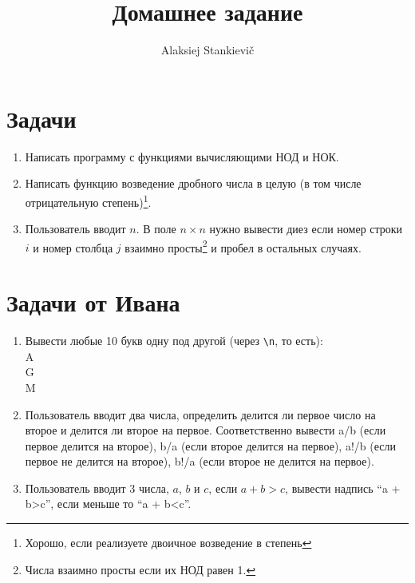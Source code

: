 \documentclass[12pt]{article}
\author{Alaksiej Stankievič}
\title{Домашнее задание}
\begin{document}

\section{Задачи}

\begin{enumerate}
 \item Написать программу с функциями вычисляющими НОД и НОК.
 \item Написать функцию возведение дробного числа в целую (в том числе отрицательную степень)\footnote{Хорошо, если реализуете двоичное возведение в степень}.
 \item Пользователь вводит $n$. В поле $n\times{}n$ нужно вывести диез если номер строки $i$ и номер столбца $j$ взаимно просты\footnote{Числа взаимно просты если их НОД равен 1.} и пробел в остальных случаях.
\end{enumerate}

\section{Задачи от Ивана}


\begin{enumerate}
 \item Вывести любые 10 букв одну под другой (через \verb|\n|, то есть):\\
A\\
G\\
M
 \item Пользователь вводит два числа, определить делится ли первое число на второе и делится ли второе на первое. Соответственно вывести a/b (если первое делится на второе), b/a (если второе делится на первое), a!/b (если первое не делится на второе), b!/a (если второе не делится на первое).
 \item Пользователь вводит 3 числа, $a$, $b$ и $c$, если $a + b>c$, вывести надпись ``a + b>c'', если меньше то ``a + b<c''.
\end{enumerate}
\end{document}
